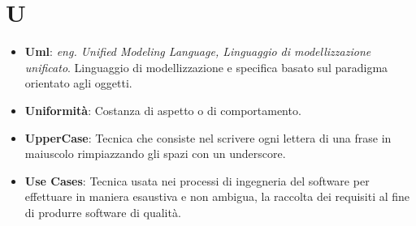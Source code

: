 \section*{U}
\begin{itemize}
	\item
	\textbf{Uml}: \textit{eng. Unified Modeling Language, Linguaggio di modellizzazione unificato}. Linguaggio di modellizzazione e specifica basato sul paradigma orientato agli oggetti.
	\item
	\textbf{Uniformità}: Costanza di aspetto o di comportamento.
	\item
	\textbf{Upper\textunderscore Case}: Tecnica che consiste nel scrivere ogni lettera di una frase in maiuscolo rimpiazzando gli spazi con un underscore.
	\item
	\textbf{Use Cases}: Tecnica usata nei processi di ingegneria del software per effettuare in maniera esaustiva e non ambigua, la raccolta dei requisiti al fine di produrre software di qualità.
\end{itemize}
\newpage